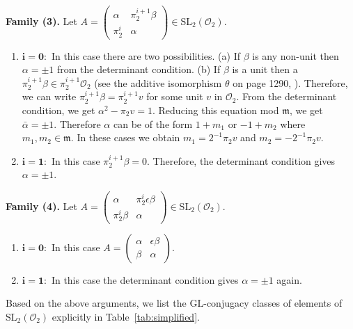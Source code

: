 \documentclass[10pt,twoside]{amsart}
\newcommand{\GL}{\mathrm{GL}}
\newcommand{\SL}{\mathrm{SL}}
\newcommand{\R}{\mathcal{O}_2}
\theoremstyle{definition}
\theoremstyle{definition}
\begin{document}
\noindent\textbf{Family (3).} Let $A=\left( \begin{array}{cc} \alpha & \pi_2^{i+1}\beta \\
\pi_2^i & \alpha\end{array} \right)\in \SL_2(\R)$.
\begin{enumerate}
\item $\mathbf{i=0}:$ In this case there are two possibilities. (a) If $\beta$ is any non-unit then $\alpha = \pm 1$ from the determinant condition.
(b) If $\beta$ is a unit then a $\pi_2^{i+1} \beta \in \pi_2^{i+1}\R$ (see the additive isomorphism $\theta$ on page 1290, \cite{BarringtonCliffWen2010}). Therefore, we can write $\pi_2^{i+1}\beta = \pi_2^{i+1}v$ for some unit $v$ in $\R$. From the determinant condition, we get $\alpha^2 - \pi_2 v = 1$. Reducing this equation mod $\mathfrak{m}$, we get $\bar{\alpha} = \pm1$. Therefore $\alpha$ can be of the form $1 + m_1$ or $-1 + m_2$ where $m_1, m_2\in \mathfrak{m}$. In these cases we obtain $m_1 = 2^{-1}\pi_2 v$ and $m_2 = -2^{-1}\pi_2 v$.

\item $\mathbf{i=1}:$ In this case $\pi_2^{i+1} \beta = 0$. Therefore, the determinant condition gives $\alpha = \pm 1$.
\end{enumerate}

\noindent\textbf{Family (4).} Let $A=\left( \begin{array}{cc} \alpha & \pi_2^i \epsilon \beta \\ \pi_2^i\beta & \alpha \end{array} \right)\in \SL_2(\R)$. 
\begin{enumerate}
\item $\mathbf{i=0}:$ In this case $A=\left( \begin{array}{cc} \alpha & \epsilon\beta \\
\beta & \alpha\end{array} \right)$.
\item $\mathbf{i=1}:$ In this case the determinant condition gives $\alpha = \pm 1$ again.
\end{enumerate}
Based on the above arguments, we list the $\GL$-conjugacy classes of elements of $\SL_2(\R)$ explicitly in Table~\ref{tab:simplified}.
\end{document}
